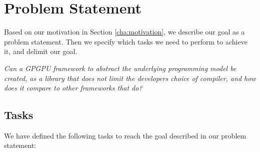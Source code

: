 \section{Problem Statement}
Based on our motivation in Section \ref{cha:motivation}, we describe our goal as a problem statement. Then we specify which tasks we need to perform to achieve it, and delimit our goal.

\textit{Can a GPGPU framework to abstract the underlying programming model be created, as a library that does not limit the developers choice of compiler, and
how does it compare to other frameworks that do?}


\subsection{Tasks} \label{cha:tasks}
We have defined the following tasks to reach the goal described in our problem statement:


